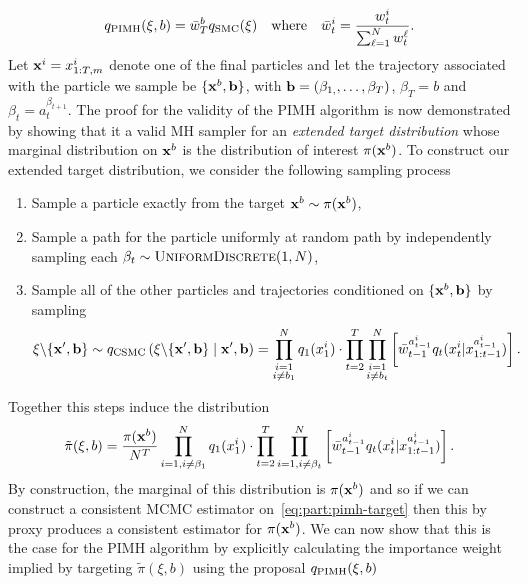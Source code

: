 \begin{align}
q_{\text{PIMH}}(\mathbf{\xi},b) = \bar{w}_T^b q_{\text{SMC}}(\mathbf{\xi}) \quad \text{where} \quad \bar{w}_t^i = \frac{{w}_t^i}{\sum_{\ell=1}^{N}w_t^{\ell}}.
\end{align}
Let $\mathbf{x}^i = x_{1:T,m}^i$ denote one of the final particles and let the trajectory associated
with the particle we sample be $\{\mathbf{x}^{b},\mathbf{b}\}$, with $\mathbf{b} = (\beta_{1,},\ldots,\beta_{T})$,
$\beta_{T} = b$ and $\beta_{t} = a_{t}^{\beta_{t+1}}$. The proof for the validity of the PIMH
algorithm is now demonstrated by showing that it a valid MH sampler for an \emph{extended target distribution}
whose marginal distribution on $\mathbf{x}^b$ is the distribution of interest $\pi(\mathbf{x}^b)$.  To construct our
extended target distribution, we consider the following sampling process
\begin{enumerate}
	\item Sample a particle exactly from the target $\mathbf{x}^b \sim \pi(\mathbf{x}^b)$,
	\item Sample a path for the particle uniformly at random path by independently sampling each $\beta_t \sim \textsc{UniformDiscrete}(1,N)$,
	\item Sample all of the other particles and trajectories conditioned on $\{\mathbf{x}^{b},\mathbf{b}\}$ by sampling \[
	\mathbf{\xi} \backslash \{\mathbf{x}', \mathbf{b}\} \sim q_{\text{CSMC}}\left(\mathbf{\xi} \backslash \{\mathbf{x}', \mathbf{b}\} \mid \mathbf{x}', \mathbf{b} \right) = 
	\prod_{\substack{i=1\\i\neq b_{1}}}^N  q_1(x_{1}^i) \cdot \prod_{t=2}^T \prod_{\substack{i=1\\i\neq b_{t}}}^N \left[
	\bar w_{t-1}^{a_{t-1}^i}q_t(x_{t}^i|x_{1:t-1}^{a_{t-1}^i})\right].
	\]
\end{enumerate}
Together this steps induce the distribution
\begin{align}
\label{eq:part:pimh-target}
\tilde{\pi}(\xi,b) = \frac{\pi(\mathbf{x}^{b})}{N^T} \prod_{i=1, i\neq\beta_1}^N q_1(x_{1}^i) \cdot \prod_{t=2}^T \prod_{i=1, i\neq\beta_t}^N \left[ 
\bar w_{t-1}^{a_{t-1}^i}
q_t(x_{t}^i|x_{1:t-1}^{a_{t-1}^i}) \right].
\end{align}
By construction, the marginal of this distribution is $\pi(\mathbf{x}^{b})$ and so if we can
construct a consistent MCMC estimator on~\ref{eq:part:pimh-target} then this by proxy
produces a consistent estimator for $\pi(\mathbf{x}^{b})$.  We can now show that this is the
case for the PIMH algorithm by explicitly calculating the importance weight implied by
targeting $\tilde{\pi}(\xi,b)$ using the proposal $q_{\text{PIMH}}(\mathbf{\xi},b)$
